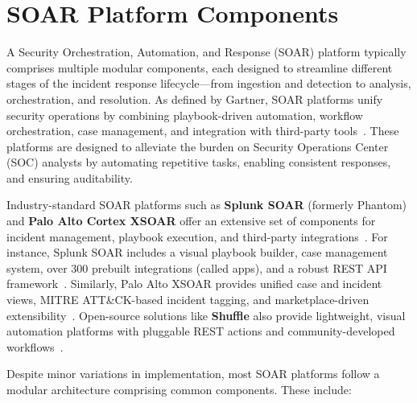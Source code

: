 \section{SOAR Platform Components}

A Security Orchestration, Automation, and Response (SOAR) platform typically comprises multiple modular components, each designed to streamline different stages of the incident response lifecycle—from ingestion and detection to analysis, orchestration, and resolution. As defined by Gartner, SOAR platforms unify security operations by combining playbook-driven automation, workflow orchestration, case management, and integration with third-party tools~\cite{gartner-siem-soar}. These platforms are designed to alleviate the burden on Security Operations Center (SOC) analysts by automating repetitive tasks, enabling consistent responses, and ensuring auditability.

Industry-standard SOAR platforms such as \textbf{Splunk SOAR} (formerly Phantom) and \textbf{Palo Alto Cortex XSOAR} offer an extensive set of components for incident management, playbook execution, and third-party integrations~\cite{splunk, paloalto}. For instance, Splunk SOAR includes a visual playbook builder, case management system, over 300 prebuilt integrations (called apps), and a robust REST API framework~\cite{splunk}. Similarly, Palo Alto XSOAR provides unified case and incident views, MITRE ATT\&CK-based incident tagging, and marketplace-driven extensibility~\cite{paloalto}. Open-source solutions like \textbf{Shuffle} also provide lightweight, visual automation platforms with pluggable REST actions and community-developed workflows~\cite{techtarget}.

Despite minor variations in implementation, most SOAR platforms follow a modular architecture comprising common components. These include:

